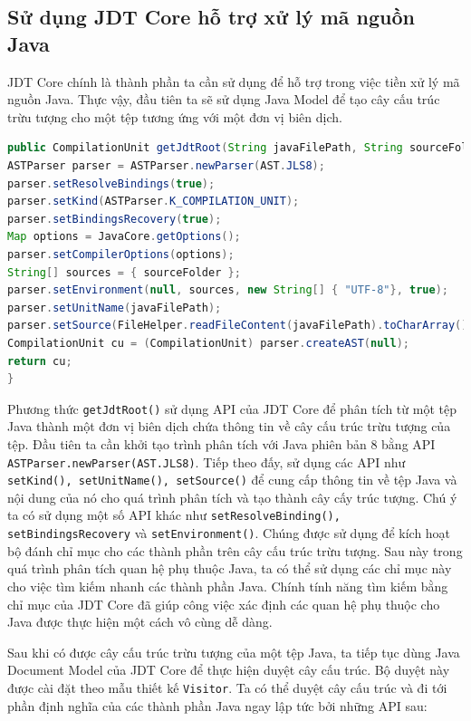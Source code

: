 \documentclass[12pt]{report}
\begin{document}
\subsection{Sử dụng JDT Core hỗ trợ xử lý mã nguồn Java}
JDT Core chính là thành phần ta cần sử dụng để hỗ trợ trong việc tiền xử lý mã nguồn Java. Thực vậy, đầu tiên ta sẽ sử dụng Java Model để tạo cây cấu trúc trừu tượng cho một tệp tương ứng với một đơn vị biên dịch.
\begin{lstlisting}[language=Java,
caption={Sử dụng API của JDT Core để tạo cây cấu trúc trừu tượng},label={code:jdt-ast-gen}]
public CompilationUnit getJdtRoot(String javaFilePath, String sourceFolder) throws IOException {
ASTParser parser = ASTParser.newParser(AST.JLS8);
parser.setResolveBindings(true);
parser.setKind(ASTParser.K_COMPILATION_UNIT);
parser.setBindingsRecovery(true);
Map options = JavaCore.getOptions();
parser.setCompilerOptions(options);
String[] sources = { sourceFolder };
parser.setEnvironment(null, sources, new String[] { "UTF-8"}, true);
parser.setUnitName(javaFilePath);
parser.setSource(FileHelper.readFileContent(javaFilePath).toCharArray());
CompilationUnit cu = (CompilationUnit) parser.createAST(null);
return cu;
}
\end{lstlisting}

Phương thức \texttt{getJdtRoot()} sử dụng API của JDT Core để phân tích từ một tệp Java thành một đơn vị biên dịch chứa thông tin về cây cấu trúc trừu tượng của tệp. Đầu tiên ta cần khởi tạo trình phân tích với Java phiên bản 8 bằng API \texttt{ASTParser.newParser(AST.JLS8)}. Tiếp theo đấy, sử dụng các API như \texttt{setKind(), setUnitName(), setSource()} để cung cấp thông tin về tệp Java và nội dung của nó cho quá trình phân tích và tạo thành cây cấy trúc tượng. Chú ý ta có sử dụng một số API khác như \texttt{setResolveBinding(), setBindingsRecovery} và \texttt{setEnvironment()}. Chúng được sử dụng để kích hoạt bộ đánh chỉ mục cho các thành phần trên cây cấu trúc trừu tượng. Sau này trong quá trình phân tích quan hệ phụ thuộc Java, ta có thể sử dụng các chỉ mục này cho việc tìm kiếm nhanh các thành phần Java. Chính tính năng tìm kiếm bằng chỉ mục của JDT Core đã giúp công việc xác định các quan hệ phụ thuộc cho Java được thực hiện một cách vô cùng dễ dàng.

Sau khi có được cây cấu trúc trừu tượng của một tệp Java, ta tiếp tục dùng Java Document Model của JDT Core để thực hiện duyệt cây cấu trúc. Bộ duyệt này được cài đặt theo mẫu thiết kế \texttt{Visitor}. Ta có thể duyệt cây cấu trúc và đi tới phần định nghĩa của các thành phần Java ngay lập tức bởi những API sau:
\end{document}
